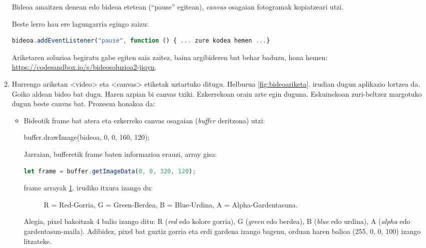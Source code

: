 \begin{enumerate}
Bideoa amaitzen denean edo bideoa etetean (``pause'' egitean), \textit{canvas} osagaian fotogramak kopiatzeari utzi.

Beste lerro hau ere lagungarria egingo zaizu:

\begin{lstlisting}[language=JavaScript,numbers=none]
bideoa.addEventListener("pause", function () { ... zure kodea hemen ...}
\end{lstlisting}

Ariketaren soluzioa begiratu gabe egiten saia zaitez, baina argibideren bat behar baduzu, hona hemen: \href{https://codesandbox.io/s/bideosoluzioa2-jiqyn}{https://codesandbox.io/s/bideosoluzioa2-jiqyn}.


\item Hurrengo ariketan <video> eta <canvas> etiketak uztartuko ditugu. Helburua \ref{fig:bideoariketa}. irudian dugun aplikazio lortzea da. Goiko aldean bideo bat dugu. Haren azpian bi canvas txiki. Ezkerrekoan orain arte egin duguna.
Eskuinekoan zuri-beltzez margotuko dugun beste canvas bat. Prozesua honakoa da:

\begin{itemize}
    \item Bideotik frame bat atera eta ezkerreko canvas osagaian (\textit{buffer} deritzona) utzi:

buffer.drawImage(bideoa, 0, 0, 160, 120);

Jarraian, bufferetik frame baten informazioa erauzi, array gisa:

\begin{lstlisting}[language=JavaScript,numbers=none]
let frame = buffer.getImageData(0, 0, 320, 120);
\end{lstlisting}

frame arrayak \ref{fig:bideoariketa2}. irudiko itxura izango du:

\begin{figure}[ht]
\centering
{}
\caption{R = Red-Gorria, G = Green-Berdea, B = Blue-Urdina, A = Alpha-Gardentasuna.}
\label{fig:bideoariketa2}
\end{figure}
     

Alegia, pixel bakoitzak 4 balio izango ditu: R (\textit{red} edo kolore gorria), G (\textit{green} edo berdea), B (\textit{blue}
edo urdina), A (\textit{alpha} edo gardentasun-maila). Adibidez, pixel bat guztiz gorria eta  erdi gardena izango bagenu, orduan haren balioa (255, 0, 0, 100) izango litzateke. 


\end{itemize}
\end{enumerate}

